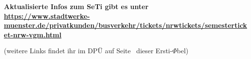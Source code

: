 \begin{multicols*}{2}
\begin{center}
	{\bfseries
	Aktualisierte Infos zum SeTi gibt es unter\\
	\url{https://www.stadtwerke-muenster.de/privatkunden/busverkehr/tickets/nrwtickets/semesterticket-nrw-vgm.html}}
	
	(weitere Links findet ihr im DPÜ auf Seite~\pageref{dpü} dieser Ersti-$\Phi$bel)
\end{center}

\end{multicols*}
